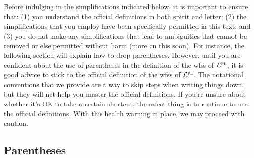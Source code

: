 Before indulging in the simplifications indicated below, it is important to ensure that: (1) you understand the official definitions in both spirit and letter; (2) the simplifications that you employ have been specifically permitted in this text; and (3) you do not make any simplifications that lead to ambiguities that cannot be removed or else permitted without harm (more on this soon).
For instance, the following section will explain how to drop parentheses. 
However, until you are confident about the use of parentheses in the definition of the wfss of $\mathcal{L}^{\textsc{pl}}$, it is good advice to stick to the official definition of the wfss of $\mathcal{L}^{\textsc{pl}}$.
The notational conventions that we provide are a way to skip steps when writing things down, but they will not help you master the official definitions.
If you're unsure about whether it's OK to take a certain shortcut, the safest thing is to continue to use the official definitions.
With this health warning in place, we may proceed with caution.






\subsection{Parentheses}
  \label{sub.parentheses}

